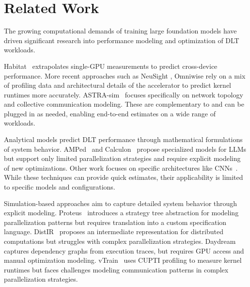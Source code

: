 \section{Related Work}

The growing computational demands of training large foundation models have driven significant research into performance modeling and optimization of DLT workloads. 

 Habitat~\cite{geoffrey2021habitat} extrapolates single-GPU measurements to predict cross-device performance. More recent approaches such as NeuSight \cite{neusight}, Omniwise \cite{omniwise} rely on a mix of profiling data and architectural details of the accelerator to predict kernel runtimes more accurately. ASTRA-sim~\cite{rashidi2020astra} focuses specifically on network topology and collective communication modeling. These are complementary to \sysname and can be plugged in as needed, enabling end-to-end estimates on a wide range of workloads.

 Analytical models predict DLT performance through mathematical formulations of system behavior. AMPed~\cite{moolchandani2023amped} and Calculon~\cite{isaev2023calculon} propose specialized models for LLMs but support only limited parallelization strategies and require explicit modeling of new optimizations. Other work focuses on specific architectures like CNNs~\cite{yan2015performance,qi2017paleo,gianniti2018performance}. While these techniques can provide quick estimates, their applicability is limited to specific models and configurations.

 Simulation-based approaches aim to capture detailed system behavior through explicit modeling. Proteus~\cite{duan2023proteus} introduces a strategy tree abstraction for modeling parallelization patterns but requires translation into a custom specification language. DistIR~\cite{santhanam2021distir} proposes an intermediate representation for distributed computations but struggles with complex parallelization strategies. Daydream~\cite{zhu2020daydream} captures dependency graphs from execution traces, but requires GPU access and manual optimization modeling. vTrain~\cite{bang2023vtrain} uses CUPTI profiling to measure kernel runtimes but faces challenges modeling communication patterns in complex parallelization strategies. 



  

 
